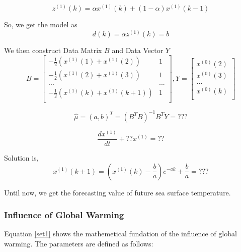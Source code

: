 \documentclass{mcmthesis}
\begin{document}
\begin{equation*}
	z^{(1)}(k) = \alpha x^{(1)}(k) + (1-\alpha)x^{(1)}(k-1)
\end{equation*}\par
	So, we get the model as
\begin{equation*}
	d(k) = \alpha z^{(1)}(k) = b
\end{equation*}\par
	We then construct Data Matrix $B$ and Data Vector $Y$
\begin{equation}
	B =  \left[ \begin{matrix}
						-\frac{1}{2}(x^{(1)}(1)+x^{(1)}(2))  & 1 \\
						-\frac{1}{2}(x^{(1)}(2)+x^{(1)}(3))  & 1 \\
										...									& ... \\
						-\frac{1}{2}(x^{(1)}(k)+x^{(1)}(k+1))  & 1 \\
\end{matrix}\right],
	Y =  \left[ \begin{matrix}
						x^{(0)}(2)\\
						x^{(0)}(3)\\
							...    \\
						x^{(0)}(k)\\
\end{matrix}\right]
\end{equation}\par
\begin{equation*} 
	\hat{\mu} = (a, b)^{T} = (B^{T}B)^{-1}B^{T}Y = ???
\end{equation*}\par
\begin{equation*}
	\frac{dx^{(1)}}{dt} + ?? x^{(1)} = ??
\end{equation*}\par
	Solution is, 
\begin{equation*}
	x^{(1)}(k+1) = (x^{(1)}(k) - \frac{b}{a})e^{-ak} + \frac{b}{a} = ???
\end{equation*}\par
	Until now, we get the forecasting value of future sea surface temperature.\par
	
\subsubsection{Influence of Global Warming}\label{S4ss2}
	Equation \ref{set1} shows the mathemetical fundation of the influence of global warming. The parameters are defined as follows:
\end{document}
